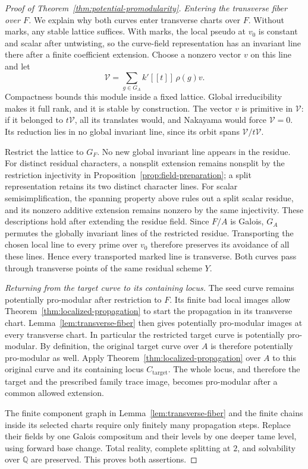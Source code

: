 \begin{proof}[Proof of Theorem~\ref{thm:potential-promodularity}]
\smallskip
\noindent\emph{Entering the transverse fiber over \(F\).}
We explain why both curves enter transverse
charts over \(F\).
Without marks, any stable lattice suffices.
With marks, the local pseudo at \(v_0\) is
constant and scalar after untwisting,
so the curve-field representation has an
invariant line there after a finite
coefficient extension.
Choose a nonzero vector \(v\) on this line
and let
\[
 \mathcal V=\sum_{g\in G_A} k'[[t]]\,\rho(g)v.
\]
Compactness bounds this module inside a fixed
lattice. Global irreducibility makes it
full rank, and it is stable by construction.
The vector \(v\) is primitive in
\(\mathcal V\): if it belonged to
\(t\mathcal V\), all its translates would,
and Nakayama would force
\(\mathcal V=0\).
Its reduction lies in no global invariant
line, since its orbit spans
\(\mathcal V/t\mathcal V\).

Restrict the lattice to \(G_F\). No new global invariant
line appears in the residue. For distinct residual
characters, a nonsplit extension remains nonsplit by
the restriction injectivity in
Proposition~\ref{prop:field-preparation}; a split
representation retains its two distinct character lines.
For scalar semisimplification, the spanning property
above rules out a split scalar residue, and its nonzero
additive extension remains nonzero by the same injectivity.
These descriptions hold after extending the residue field.
Since \(F/A\) is Galois, \(G_A\) permutes the globally
invariant lines of the restricted residue. Transporting
the chosen local line to every prime over \(v_0\) therefore
preserves its avoidance of all these lines. Hence every
transported marked line is transverse.
Both curves pass through transverse points
of the same residual scheme \(Y\).

\smallskip
\noindent\emph{Returning from the target curve to its containing locus.}
The seed curve remains potentially
pro-modular after restriction to \(F\).
Its finite bad local images allow
Theorem~\ref{thm:localized-propagation} to
start the propagation in its transverse
chart. Lemma~\ref{lem:transverse-fiber}
then gives potentially pro-modular images
at every transverse chart.
In particular the restricted target curve is potentially
pro-modular. By definition, the original target curve
over \(A\) is therefore potentially pro-modular as well.
Apply Theorem~\ref{thm:localized-propagation}
over \(A\) to this original curve and its containing
locus \(C_{\mathrm{target}}\).
The whole locus, and therefore the target
and the prescribed family trace image,
becomes pro-modular after a common allowed
extension.

The finite component graph in
Lemma~\ref{lem:transverse-fiber} and the finite chains
inside its selected charts require only finitely many
propagation steps. Replace their fields by one Galois
compositum and their levels by one deeper tame level,
using forward base change. Total reality, complete
splitting at \(2\), and solvability over \(\mathbb Q\)
are preserved.
This proves both assertions.
\end{proof}

